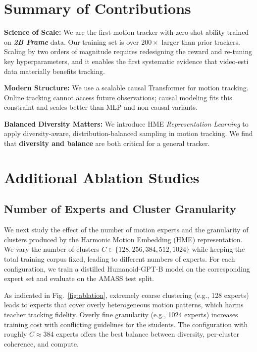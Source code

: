 \documentclass{llmxive}
\begin{document}



\appendix



\section{Summary of Contributions}

\noindent\textbf{Science of Scale:}
We are the first motion tracker with zero-shot ability trained on \textbf{\emph{2B Frame}} data.
Our training set is over \textbf{$200\times$} larger than prior trackers.
Scaling by two orders of magnitude requires redesigning the reward and re-tuning key hyperparameters, and it enables the first systematic evidence that video-esti data materially benefits tracking.

\vspace{1.5pt}
\noindent\textbf{Modern Structure:}
We use a scalable causal Transformer for motion tracking. Online tracking cannot access future observations; causal modeling fits this constraint and scales better than MLP and non-causal variants.

\vspace{1.5pt}
\noindent\textbf{Balanced Diversity Matters:}
We introduce HME \textit{Representation Learning} to apply diversity-aware, distribution-balanced sampling in motion tracking. We find that \textbf{diversity and balance} are both critical for a general tracker.

\section{Additional Ablation Studies}
\label{sec:ablations_pipeline}

\subsection{Number of Experts and Cluster Granularity}
\label{subsec:num_experts}

We next study the effect of the number of motion experts and the granularity of clusters produced by the Harmonic Motion Embedding (HME) representation.
We vary the number of clusters $C \in \{128, 256, 384, 512, 1024\}$ while keeping the total training corpus fixed, leading to different numbers of experts.
For each configuration, we train a distilled Humanoid-GPT-B model on the corresponding expert set and evaluate on the AMASS test split.

As indicated in Fig.~\ref{fig:ablation}, extremely coarse clustering (e.g., 128 experts) leads to experts that cover overly heterogeneous motion patterns, which harms teacher tracking fidelity.
Overly fine granularity (e.g., 1024 experts) increases training cost with conflicting guidelines for the students.
The configuration with roughly $C \approx 384$ experts offers the best balance between diversity, per-cluster coherence, and compute.
\end{document}
